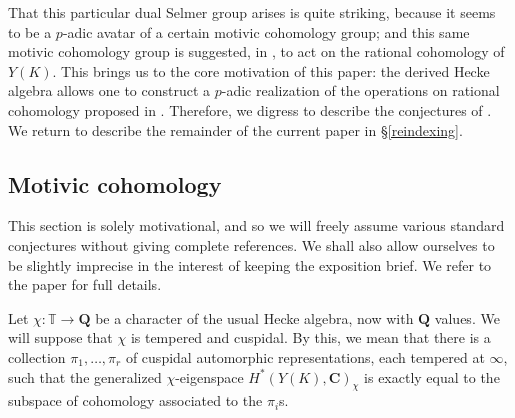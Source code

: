 \documentclass[10pt]{amsart}
\newcommand{\changecolor}{black}
\newcommand{\gHecke}{\tilde{\mathbb{T}}}
\newcommand{\Q}{\mathbf{Q}}
\newcommand{\C}{\mathbf{C}}
\theoremstyle{remark}
\newtheorem*{remark}{Remark}
\begin{document}
That this particular dual Selmer group arises is quite striking, because
it seems to be a $p$-adic avatar of a certain motivic cohomology group;
and this same motivic cohomology group is suggested, in \cite{PV},
to act on the rational cohomology of $Y(K)$. 
 This brings us to the core motivation of this paper:
the derived Hecke algebra allows one to construct a $p$-adic realization of the 
operations on rational cohomology proposed in \cite{PV}.  
Therefore, we   digress to describe the conjectures of \cite{PV}. 
 We return to describe the remainder of  the current paper in 
\S \ref{reindexing}. 
%
%
    
 
    
    

 
 \subsection{Motivic cohomology}  \label{sec:MV} 
 
 This section is solely motivational, and so we will  
 freely assume various standard conjectures without giving complete references. We shall also allow ourselves to be slightly imprecise  
 in the interest of keeping the exposition brief. We refer to the paper \cite{PV} for full details. 
 
 Let $\chi: \mathbb{T} \rightarrow \Q$ be a character of the usual Hecke algebra, now with $\Q$ values. 
  We will suppose that $\chi$ is tempered and cuspidal. By this, we mean that 
  there is a collection $\pi_1, \dots, \pi_r$ of cuspidal automorphic representations, each tempered at $\infty$, 
  such that the generalized $\chi$-eigenspace $H^*(Y(K), \C)_{\chi}$  is exactly equal to the subspace of cohomology associated to the $\pi_i$s. 
  
\end{document}
